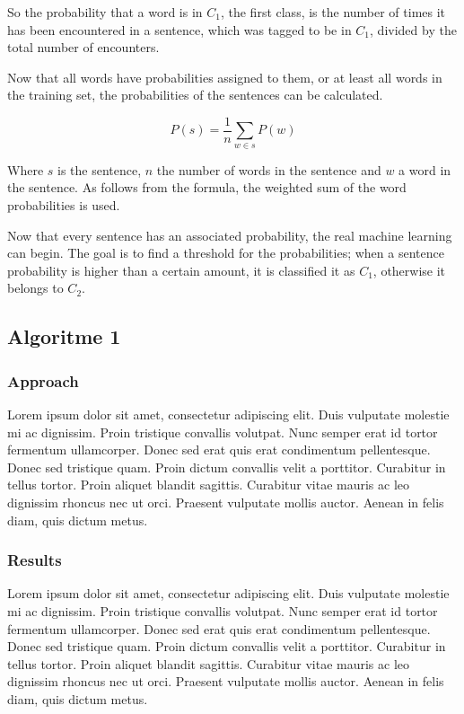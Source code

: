 \documentclass[11pt]{article}
\begin{document}
So the probability that a word is in $C_1$, the first class, is the number of times it has been encountered in a sentence, which was tagged to be in $C_1$, divided by the total number of encounters.

Now that all words have probabilities assigned to them, or at least all words in the training set, the probabilities of the sentences can be calculated.

\begin{equation}
P(s) = \frac{1}{n} \sum_{w \in s} P(w)
\end{equation}

Where $s$ is the sentence, $n$ the number of words in the sentence and $w$ a word in the sentence. As follows from the formula,  the weighted sum of the word probabilities is used.

Now that every sentence has an associated probability, the real machine learning can begin. The goal is to find a threshold for the probabilities; when a sentence probability is higher than a certain amount, it is classified it as $C_1$,  otherwise it belongs to $C_2$.

\subsection{Algoritme 1}
\subsubsection{Approach}
Lorem ipsum dolor sit amet, consectetur adipiscing elit. Duis vulputate molestie mi ac dignissim. Proin tristique convallis volutpat. Nunc semper erat id tortor fermentum ullamcorper. Donec sed erat quis erat condimentum pellentesque. Donec sed tristique quam. Proin dictum convallis velit a porttitor. Curabitur in tellus tortor. Proin aliquet blandit sagittis. Curabitur vitae mauris ac leo dignissim rhoncus nec ut orci. Praesent vulputate mollis auctor. Aenean in felis diam, quis dictum metus.

\subsubsection{Results}
Lorem ipsum dolor sit amet, consectetur adipiscing elit. Duis vulputate molestie mi ac dignissim. Proin tristique convallis volutpat. Nunc semper erat id tortor fermentum ullamcorper. Donec sed erat quis erat condimentum pellentesque. Donec sed tristique quam. Proin dictum convallis velit a porttitor. Curabitur in tellus tortor. Proin aliquet blandit sagittis. Curabitur vitae mauris ac leo dignissim rhoncus nec ut orci. Praesent vulputate mollis auctor. Aenean in felis diam, quis dictum metus.
\end{document}
